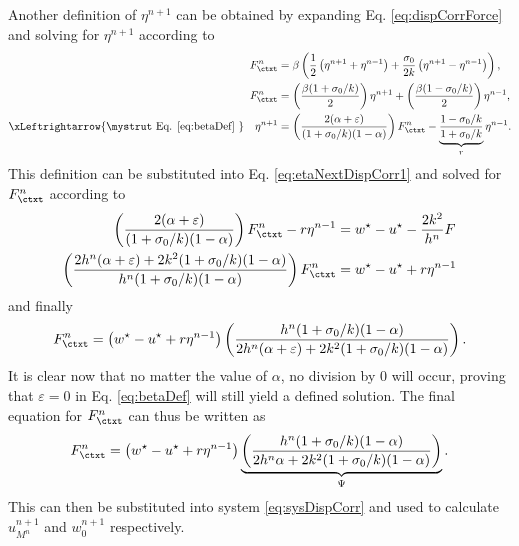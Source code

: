 Another definition of $\eta^{n+1}$ can be obtained by expanding Eq. \eqref{eq:dispCorrForce} and solving for $\eta^{n+1}$ according to
\begin{align}
    F_\ctxt^n &= \beta\left(\frac{1}{2}\left(\eta^{n+1}+\eta^{n-1}\right) + \frac{\sigma_0}{2k}\left(\eta^{n+1}-\eta^{n-1}\right)\right)\nonumber,\\
    F_\ctxt^n&= \left(\frac{\beta (1 + \sigma_0/k)}{2}\right)\eta^{n+1} + \left(\frac{\beta (1 - \sigma_0/k)}{2}\right) \eta^{n-1}\nonumber,\\
    \xLeftrightarrow{\mystrut\ \text{Eq. \eqref{eq:betaDef}}\ } \quad \eta^{n+1} &= \left(\frac{2
    (\alpha +\varepsilon)}{(1+\sigma_0/k)(1-\alpha)}\right)F_\ctxt^n - \underbrace{\frac{1-\sigma_0/k}{1+\sigma_0/k}}_{r}\eta^{n-1}.\label{eq:etaNextDispCorr2}
\end{align}
This definition can be substituted into Eq. \eqref{eq:etaNextDispCorr1} and solved for $F_\ctxt^n$ according to 
\begin{align*}
    \left(\frac{2
    (\alpha +\varepsilon)}{(1+\sigma_0/k)(1-\alpha)}\right)F_\ctxt^n - r \eta^{n-1} &= w^\star - u^\star- \frac{2k^2}{h^n}F\\
    \left(\frac{2h^n
    (\alpha +\varepsilon) + 2k^2(1+\sigma_0/k)(1-\alpha)}{h^n(1+\sigma_0/k)(1-\alpha)}\right)F_\ctxt^n &= w^\star - u^\star+r\eta^{n-1}
\end{align*}
and finally 
\begin{equation*}
    F_\ctxt^n = \left(w^\star - u^\star+r\eta^{n-1}\right)\left(\frac{h^n(1+\sigma_0/k)(1-\alpha)}{2h^n (\alpha +\varepsilon) + 2k^2(1+\sigma_0/k)(1-\alpha)}\right).
\end{equation*}
It is clear now that no matter the value of $\alpha$, no division by 0 will occur, proving that $\varepsilon = 0$ in Eq. \eqref{eq:betaDef} will still yield a defined solution. The final equation for $F_\ctxt^n$ can thus be written as
\begin{equation}\label{eq:finalForce}
    F_\ctxt^n = \left(w^\star - u^\star+r\eta^{n-1}\right)\underbrace{\left(\frac{h^n(1+\sigma_0/k)(1-\alpha)}{2h^n\alpha + 2k^2(1+\sigma_0/k)(1-\alpha)}\right)}_{\Psi}.
\end{equation}
This can then be substituted into system \eqref{eq:sysDispCorr} and used to calculate $u_{M^n}^{n+1}$ and $w_0^{n+1}$ respectively. 


